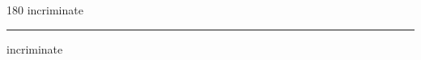
\begin{frame}
\begin{center}
\begin{turn}{180}
{\fontsize{2.5cm}{1em}\selectfont incriminate}
\end{turn}
\vspace{1em}\par  
\hrule
\vspace{1em}\par  
{\fontsize{2.5cm}{1em}\selectfont incriminate}
\end{center}
\end{frame}
